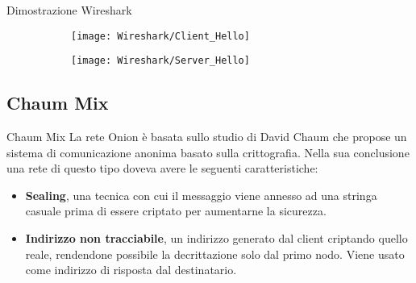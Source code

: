 \begin{frame}{Dimostrazione Wireshark}
    \begin{figure}[htbp]
        \begin{subfigure}[c]{0.5\textwidth}
            \texttt{[image: Wireshark/Client\_Hello]}
        \end{subfigure}
        \begin{subfigure}[c]{0.49\textwidth}
            \texttt{[image: Wireshark/Server\_Hello]}
        \end{subfigure}
    \end{figure}
\end{frame}

\subsection{Chaum Mix}
\begin{frame}{Chaum Mix}
    La rete Onion è basata sullo studio di David Chaum che propose un sistema di comunicazione anonima basato sulla crittografia. Nella sua conclusione una rete di questo tipo doveva avere le seguenti caratteristiche:
    \begin{itemize}
        \item \textbf{Sealing}, una tecnica con cui il messaggio viene annesso ad una stringa casuale prima di essere criptato per aumentarne la sicurezza.
        \item \textbf{Indirizzo non tracciabile}, un indirizzo generato dal client criptando quello reale, rendendone possibile la decrittazione solo dal primo nodo. Viene usato come indirizzo di risposta dal destinatario.
    \end{itemize}
\end{frame}